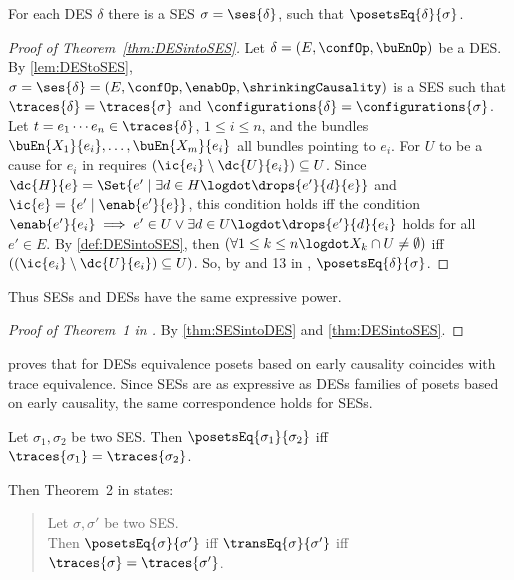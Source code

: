 \documentclass[runningheads,a4paper]{llncs}
\begin{document}
\begin{theorem}
	\label{thm:DESintoSES}
	For each DES $ \delta $ there is a SES $ \sigma  = \ses{\delta} $, such that $  \posetsEq{\delta} {\sigma} $.
\end{theorem}

\begin{proof}[Proof of Theorem~\ref{thm:DESintoSES}]
	Let $ \delta = \left( E, \confOp, \buEnOp \right) $ be a DES. By \lem\ref{lem:DEStoSES}, $ \sigma = \ses{\delta} = \left( E, \confOp, \enabOp, \shrinkingCausality \right) $ is a SES such that $ \traces{\delta} = \traces{\sigma} $ and $ \configurations{\delta} = \configurations{\sigma} $.\\
	Let $ t = e_1 \cdots e_n \in \traces{\delta} $, $ 1 \leq i \leq n $, and the bundles $ \buEn{X_1}{e_i}, \ldots, \buEn{X_m}{e_i} $ all bundles pointing to $ e_i $.
	For $ U $ to be a cause for $ e_i $  in \cite{dynamicCausality15} requires $ ( \ic{e_i} \setminus \dc{U}{e_i} ) \subseteq U $.
	Since $ \dc{H}{e} = \Set{ e' \mid \exists d \in H \logdot \drops{e'}{d}{e} } $ and $ \ic{e} = \{ e' \mid \enab{e'}{e} \} $, this condition holds iff the condition $ \enab{e'}{e_i} \implies e' \in U \lor \exists d \in U \logdot \drops{e'}{d}{e_i} $ holds for all $ e' \in E $.
	By \ref{def:DESintoSES}, then $ ( \forall 1 \leq k \leq n \logdot X_k \cap U \neq \emptyset) $ iff $ \left( \left( \ic{e_i} \setminus \dc{U}{e_i} \right) \subseteq U \right) $.
	So, by  and 13 in \cite{dynamicCausality15}, $  \posetsEq{\delta}{\sigma} $.
\end{proof}

Thus SESs and DESs have the same expressive power.

\begin{proof}[Proof of Theorem~1 in \cite{dynamicCausality15}]
	By \ths\ref{thm:SESintoDES} and \ref{thm:DESintoSES}.
\end{proof}

\cite{Langerak97causalambiguity} proves that for DESs equivalence \wrt posets
based on early causality coincides with trace equivalence. Since SESs are as expressive as DESs \wrt families of posets based on early causality, the same correspondence holds for SESs.

\begin{corollary}
	\label{col:SESequiv}
	Let $ \sigma_1, \sigma_2 $ be two SES. Then $ \posetsEq{\sigma_1 }{\sigma_2} $ iff $ \traces{\sigma_1} = \traces{\sigma_2} $.
\end{corollary}

Then Theorem~2 in \cite{dynamicCausality15} states:
\begin{quote}
	Let $ \sigma, \sigma' $ be two SES.\\
	Then $ \posetsEq{\sigma }{ \sigma'} $ iff $ \transEq{\sigma}{\sigma'}$ iff $ \traces{\sigma} = \traces{\sigma'} $.
\end{quote}
\end{document}
